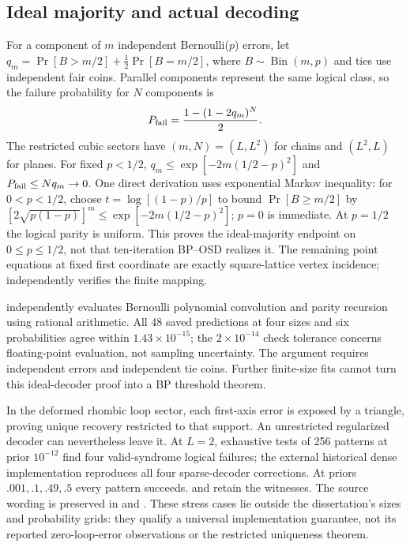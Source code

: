 \subsection{Ideal majority and actual decoding}
For a component of $m$ independent Bernoulli($p$) errors, let $q_m=\Pr[B>m/2]+\tfrac12\Pr[B=m/2]$, where $B\sim\operatorname{Bin}(m,p)$ and ties use independent fair coins. Parallel components represent the same logical class, so the failure probability for $N$ components is
\[P_{\rm fail}=\frac{1-(1-2q_m)^N}{2}.\]
The restricted cubic sectors have $(m,N)=(L,L^2)$ for chains and $(L^2,L)$ for planes. For fixed $p<1/2$, $q_m\le\exp[-2m(1/2-p)^2]$ and $P_{\rm fail}\le Nq_m\to0$. One direct derivation uses exponential Markov inequality: for $0<p<1/2$, choose $t=\log[(1-p)/p]$ to bound $\Pr[B\ge m/2]$ by $[2\sqrt{p(1-p)}]^m\le\exp[-2m(1/2-p)^2]$; $p=0$ is immediate. At $p=1/2$ the logical parity is uniform. This proves the ideal-majority endpoint on $0\le p\le1/2$, not that ten-iteration BP--OSD realizes it. The remaining point equations at fixed first coordinate are exactly square-lattice vertex incidence;  independently verifies the finite mapping.

 independently evaluates Bernoulli polynomial convolution and parity recursion using rational arithmetic. All 48 saved predictions at four sizes and six probabilities agree within $1.43\times10^{-15}$; the $2\times10^{-14}$ check tolerance concerns floating-point evaluation, not sampling uncertainty. The argument requires independent errors and independent tie coins. Further finite-size fits cannot turn this ideal-decoder proof into a BP threshold theorem.

In the deformed rhombic loop sector, each first-axis error is exposed by a triangle, proving unique recovery restricted to that support. An unrestricted regularized decoder can nevertheless leave it. At $L=2$, exhaustive tests of 256 patterns at prior $10^{-12}$ find four valid-syndrome logical failures; the external historical dense implementation reproduces all four sparse-decoder corrections. At priors $.001,.1,.49,.5$ every pattern succeeds.  and  retain the witnesses. The source wording is preserved in  and . These stress cases lie outside the dissertation's sizes and probability grids: they qualify a universal implementation guarantee, not its reported zero-loop-error observations or the restricted uniqueness theorem.

